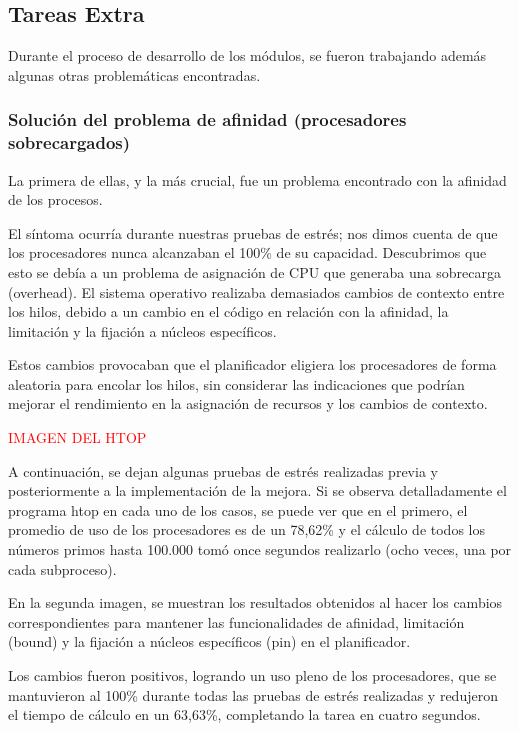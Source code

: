 \subsection{Tareas Extra}

Durante el proceso de desarrollo de los módulos, se fueron trabajando además algunas otras problemáticas encontradas.


\subsubsection{Solución del problema de afinidad (procesadores sobrecargados)}

La primera de ellas, y la más crucial, fue un problema encontrado con la afinidad de los procesos.

El síntoma ocurría durante nuestras pruebas de estrés; nos dimos cuenta de que los procesadores nunca alcanzaban el 100\% de su capacidad. Descubrimos que esto se debía a un problema de asignación de CPU que generaba una sobrecarga (overhead). El sistema operativo realizaba demasiados cambios de contexto entre los hilos, debido a un cambio en el código en relación con la afinidad, la limitación y la fijación a núcleos específicos.

Estos cambios provocaban que el planificador eligiera los procesadores de forma aleatoria para encolar los hilos, sin considerar las indicaciones que podrían mejorar el rendimiento en la asignación de recursos y los cambios de contexto.

\textcolor{red}{IMAGEN DEL HTOP}

A continuación, se dejan algunas pruebas de estrés realizadas previa y posteriormente a la implementación de la mejora. Si se observa detalladamente el programa htop en cada uno de los casos, se puede ver que en el primero, el promedio de uso de los procesadores es de un 78,62\% y el cálculo de todos los números primos hasta 100.000 tomó once segundos realizarlo (ocho veces, una por cada subproceso).

En la segunda imagen, se muestran los resultados obtenidos al hacer los cambios correspondientes para mantener las funcionalidades de afinidad, limitación (bound) y la fijación a núcleos específicos (pin) en el planificador.

Los cambios fueron positivos, logrando un uso pleno de los procesadores, que se mantuvieron al 100\% durante todas las pruebas de estrés realizadas y redujeron el tiempo de cálculo en un 63,63\%, completando la tarea en cuatro segundos.

